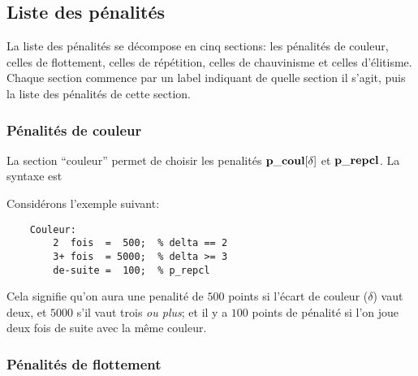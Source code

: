 \documentclass[10pt]{article}
\begin{document}
\medbreak

\subsection{Liste des p\'enalit\'es}

La liste des p\'enalit\'es se d\'ecompose en cinq sections: les 
p\'enalit\'es de couleur, celles de flottement, celles de 
r\'ep\'etition, celles de chauvinisme et celles d'\'elitisme.  Chaque 
section commence par un label indiquant de quelle section il s'agit, 
puis la liste des p\'enalit\'es de cette section.

\medbreak
{}
\medbreak

\subsubsection{P\'enalit\'es de couleur}

La section ``couleur'' permet de choisir les penalit\'es ${\bf p\_coul}
[\delta]$ et $\bf p\_repcl$. La syntaxe est

\medbreak
{}
\medbreak

\noindent Consid\'erons l'exemple suivant:
\begin{verbatim}
    Couleur:
        2  fois  =  500;  % delta == 2
        3+ fois  = 5000;  % delta >= 3
        de-suite =  100;  % p_repcl
\end{verbatim}
Cela signifie qu'on aura une penalit\'e de $500$ points si l'\'ecart de
couleur ($\delta$) vaut deux, et $5000$ s'il vaut trois {\em ou plus\/}; et
il y a $100$ points de p\'enalit\'e si l'on joue deux fois de suite avec la
m\^eme couleur.

\subsubsection{P\'enalit\'es de flottement}
\end{document}
